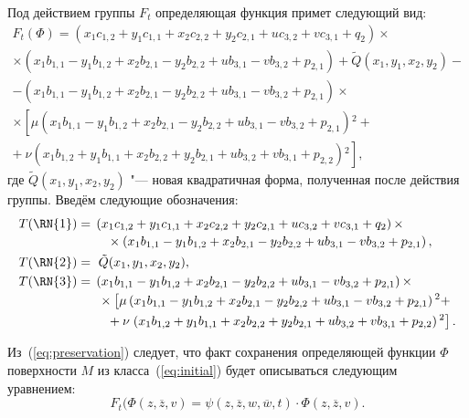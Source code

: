 \documentclass[a4paper,14pt]{extarticle}
\begin{document}
Под действием группы $F_t$ определяющая функция примет следующий вид:
\begin{multline*}
F_t(\Phi) = \left(x_1 c_{1,2}+y_1 c_{1,1}+x_2 c_{2,2}+y_2 c_{2,1} + u c_{3,2}+v c_{3,1}+q_2\right) \times \\ 
\times \left(x_1 b_{1,1}-y_1 b_{1,2}+x_2 b_{2,1}-y_2 b_{2,2} + u b_{3,1}-v b_{3,2}+p_{2,1}\right) + \tilde{Q}(x_1,y_1,x_2,y_2) - \\
-\left(x_1 b_{1,1}-y_1 b_{1,2}+x_2 b_{2,1}-y_2 b_{2,2}+ u b_{3,1}-v b_{3,2}+p_{2,1}\right) \times \\
\times \left[\mu  \left(x_1 b_{1,1}-y_1 b_{1,2}+x_2 b_{2,1}-y_2 b_{2,2} + u b_{3,1}-v b_{3,2}+p_{2,1}\right){}^2 + \right. \\ 
+ \ \left. \nu \left(x_1 b_{1,2}+y_1 b_{1,1}+x_2 b_{2,2}+y_2 b_{2,1} + u b_{3,2}+v b_{3,1} + p_{2,2}\right){}^2 \right],
\end{multline*}
где $\tilde{Q}(x_1, y_1, x_2, y_2)$ "--- новая квадратичная форма, полученная после действия группы. Введём следующие обозначения:
\begin{align*}
T(\mathrm{\RN{1}}) &= 
\begin{multlined}[t]
\left(x_1 c_{1,2}+y_1 c_{1,1}+x_2 c_{2,2}+y_2 c_{2,1} + u c_{3,2}+v c_{3,1}+q_2\right) \times \\ 
\times \left(x_1 b_{1,1}-y_1 b_{1,2}+x_2 b_{2,1}-y_2 b_{2,2} + u b_{3,1}-v b_{3,2}+p_{2,1}\right),
\end{multlined}\\
T(\mathrm{\RN{2}}) &= 
\begin{multlined}[t]
\ \tilde{Q}(x_1,y_1,x_2,y_2),
\end{multlined}\\
T(\mathrm{\RN{3}}) &= 
\begin{multlined}[t]
\left(x_1 b_{1,1}-y_1 b_{1,2}+x_2 b_{2,1}-y_2 b_{2,2} + u b_{3,1}-v b_{3,2} + p_{2,1}\right) \times \\
\times \left[\mu  \left(x_1 b_{1,1}-y_1 b_{1,2}+x_2 b_{2,1}-y_2 b_{2,2} + u b_{3,1}-v b_{3,2}+p_{2,1}\right){}^2 + \right. \\ 
+ \nu \left. \left(x_1 b_{1,2}+y_1 b_{1,1}+x_2 b_{2,2}+y_2 b_{2,1} + u b_{3,2}+v b_{3,1} + p_{2,2}\right){}^2 \right].
\end{multlined}
\end{align*}

Из~(\ref{eq:preservation}) следует, что факт сохранения определяющей функции $\Phi$ поверхности $M$ из класса~(\ref{eq:initial}) будет описываться следующим уравнением:
\begin{equation}\label{eq:preservation_m}
F_t(\Phi(z, \overline{z}, v) = \psi(z, \overline{z}, w, \overline{w}, t) \cdot \Phi(z, \overline{z}, v). 
\end{equation}
\end{document}
